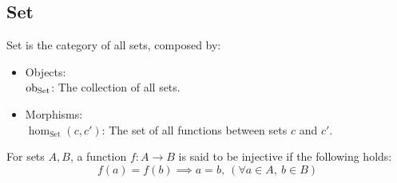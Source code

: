 \subsection{Set}
\begin{definition}[Set]
  Set is the category of all sets, composed by:
  \parencite{awodey:category_theory}
  \begin{itemize}
    \item Objects:\\
      $\mathrm{ob}_{\mathrm{Set}}$: The collection of all sets.
    \item Morphisms:\\
      $\hom_{\mathrm{Set}}(c, c')$: The set of all functions between sets $c$ and
      $c'$.
  \end{itemize}
\end{definition}

\begin{definition}
  For sets $A,B$, a function $f:A\to B$ is said to be injective if the following
  holds:
  \[f(a)=f(b) \implies a=b,\ (\forall a\in A,\ b\in B)\]
\end{definition}

